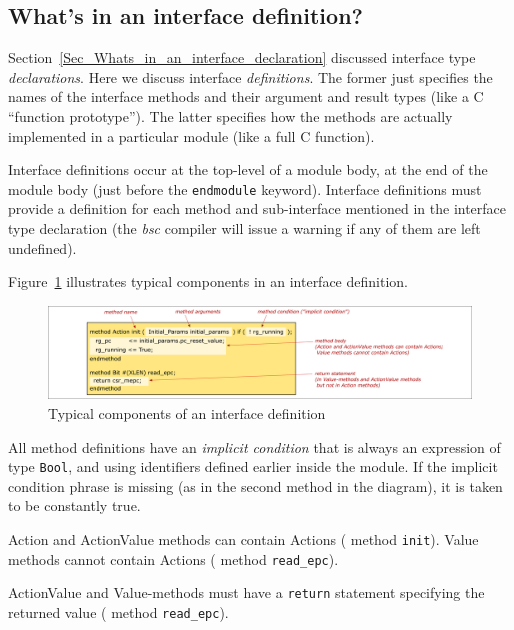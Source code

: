 \subsection{What's in an interface definition?}

\label{Sec_Whats_in_an_interface_definition}


Section~\ref{Sec_Whats_in_an_interface_declaration} discussed
interface type \emph{declarations}.  Here we discuss interface
\emph{definitions}.  The former just specifies the names of the
interface methods and their argument and result types (like a C
``function prototype'').  The latter specifies how the methods are
actually implemented in a particular module (like a full C function).

Interface definitions occur at the top-level of a module body, at the
end of the module body (just before the \verb|endmodule| keyword).
Interface definitions must provide a definition for each method and
sub-interface mentioned in the interface type declaration (the
\emph{bsc} compiler will issue a warning if any of them are left
undefined).

Figure~\ref{Fig_BSV_whats_in_an_interface_def} illustrates typical
components in an interface definition.
\begin{figure}[htbp]
  \centerline{\includegraphics[width=6in,angle=0]{Figures/Fig_BSV_whats_in_an_interface_def}}
  \caption{\label{Fig_BSV_whats_in_an_interface_def}
           Typical components of an interface definition}
\end{figure}
All method definitions have an \emph{implicit condition} that is
always an expression of type \verb|Bool|, and using identifiers
defined earlier inside the module.  If the implicit condition phrase
is missing (as in the second method in the diagram), it is taken to be
constantly true.

Action and ActionValue methods can contain Actions ({\eg} method
\verb|init|).  Value methods cannot contain Actions ({\eg} method
\verb|read_epc|).

ActionValue and Value-methods must have a \verb|return| statement
specifying the returned value ({\eg} method \verb|read_epc|).

